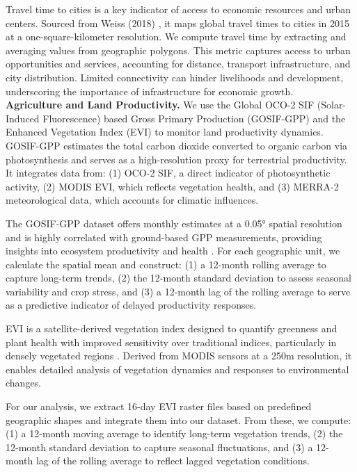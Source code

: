 \documentclass[pdflatex,sn-mathphys-num]{sn-jnl}%
\theoremstyle{thmstyleone}%
\theoremstyle{thmstyletwo}%
\theoremstyle{thmstylethree}%
\begin{document}
Travel time to cities is a key indicator of access to economic resources and urban centers. Sourced from Weiss (2018) \cite{weiss2018global}, it maps global travel times to cities in 2015 at a one-square-kilometer resolution. We compute travel time by extracting and averaging values from geographic polygons. This metric captures access to urban opportunities and services, accounting for distance, transport infrastructure, and city distribution. Limited connectivity can hinder livelihoods and development, underscoring the importance of infrastructure for economic growth.\\

\noindent\textbf{Agriculture and Land Productivity.}
We use the Global OCO-2 SIF (Solar-Induced Fluorescence) based Gross Primary Production (GOSIF-GPP) and the Enhanced Vegetation Index (EVI) to monitor land productivity dynamics. GOSIF-GPP estimates the total carbon dioxide converted to organic carbon via photosynthesis and serves as a high-resolution proxy for terrestrial productivity. It integrates data from: (1) OCO-2 SIF, a direct indicator of photosynthetic activity, (2) MODIS EVI, which reflects vegetation health, and (3) MERRA-2 meteorological data, which accounts for climatic influences.

The GOSIF-GPP dataset offers monthly estimates at a 0.05° spatial resolution and is highly correlated with ground-based GPP measurements, providing insights into ecosystem productivity and health \cite{Li_Xiao_He_2020}. For each geographic unit, we calculate the spatial mean and construct: (1) a 12-month rolling average to capture long-term trends, (2) the 12-month standard deviation to assess seasonal variability and crop stress, and (3) a 12-month lag of the rolling average to serve as a predictive indicator of delayed productivity responses.

EVI is a satellite-derived vegetation index designed to quantify greenness and plant health with improved sensitivity over traditional indices, particularly in densely vegetated regions \cite{huete2010modis}. Derived from MODIS sensors at a 250m resolution, it enables detailed analysis of vegetation dynamics and responses to environmental changes.

For our analysis, we extract 16-day EVI raster files based on predefined geographic shapes and integrate them into our dataset. From these, we compute: (1) a 12-month moving average to identify long-term vegetation trends, (2) the 12-month standard deviation to capture seasonal fluctuations, and (3) a 12-month lag of the rolling average to reflect lagged vegetation conditions.
\end{document}
